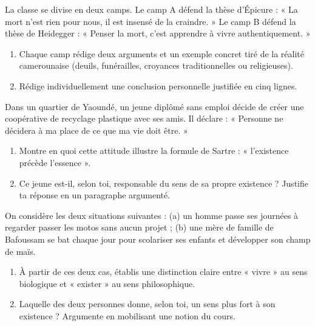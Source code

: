 \documentclass[11pt]{article}
\newcounter{popsec}
\newcounter{popsub}
\newcommand{\courssub}[1]{%
  \stepcounter{popsub}%
  \par\vspace{9pt}\noindent{\popxbold\fontsize{11.5}{13}\selectfont\color{popink}{\color{poporange}\thepopsec.\thepopsub}\hspace{6pt}#1}\par\nopagebreak\vspace{4pt}
}
\begin{document}
\begin{exercice}
La classe se divise en deux camps. Le camp A défend la thèse d'Épicure : « La mort n'est rien pour nous, il est insensé de la craindre. » Le camp B défend la thèse de Heidegger : « Penser la mort, c'est apprendre à vivre authentiquement. »
\begin{enumerate}
\item Chaque camp rédige deux arguments et un exemple concret tiré de la réalité camerounaise (deuils, funérailles, croyances traditionnelles ou religieuses).
\item Rédige individuellement une conclusion personnelle justifiée en cinq lignes.
\end{enumerate}
\end{exercice}

\begin{exercice}
Dans un quartier de Yaoundé, un jeune diplômé sans emploi décide de créer une coopérative de recyclage plastique avec ses amis. Il déclare : « Personne ne décidera à ma place de ce que ma vie doit être. »
\begin{enumerate}
\item Montre en quoi cette attitude illustre la formule de Sartre : « l'existence précède l'essence ».
\item Ce jeune est-il, selon toi, responsable du sens de sa propre existence ? Justifie ta réponse en un paragraphe argumenté.
\end{enumerate}
\end{exercice}

\begin{exercice}
On considère les deux situations suivantes : (a) un homme passe ses journées à regarder passer les motos sans aucun projet ; (b) une mère de famille de Bafoussam se bat chaque jour pour scolariser ses enfants et développer son champ de maïs.
\begin{enumerate}
\item À partir de ces deux cas, établis une distinction claire entre « vivre » au sens biologique et « exister » au sens philosophique.
\item Laquelle des deux personnes donne, selon toi, un sens plus fort à son existence ? Argumente en mobilisant une notion du cours.
\end{enumerate}
\end{exercice}

\courssub{Je me prépare au Bac}
\end{document}
